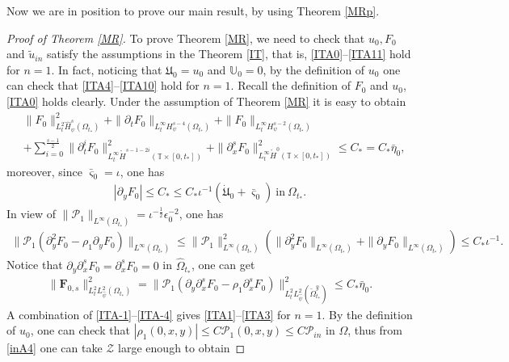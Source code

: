 \documentclass{amsart}
\numberwithin{equation}{section}
\begin{document}
Now we are in position to prove our main result, by using Theorem \ref{MRp}.
\begin{proof}[Proof of Theorem \ref{MR}]
To prove Theorem \ref{MR}, we need to check that $u_{0}, F_{0}$ and $\tilde{u}_{in}$ satisfy the assumptions in the Theorem \ref{IT}, that is, \eqref{ITA0}--\eqref{ITA11} hold for $n=1$.
In fact, noticing that $\mathfrak{U}_{0}=u_{0}$ and $\mathbb{U}_{0}=0$, by the definition of $u_{0}$ one can check that \eqref{ITA4}--\eqref{ITA10} hold for $n=1$.
Recall the definition of $F_{0}$ and $u_{0}$, \eqref{ITA0} holds clearly. Under the assumption of Theorem \ref{MR} it is easy to obtain
\begin{align}\label{ITA-1}
& \|F_{0}\|_{L_{t}^{2}\hat{H}_{\psi}^{s}(\Omega_{t_{*}})}^{2}
 +\|\partial_{t}F_{0}\|_{L_{t}^{\infty}H_{\psi}^{s-4}(\Omega_{t_{*}})}+\|F_{0}\|_{L_{t}^{\infty}H_{\psi}^{s-2}(\Omega_{t_{*}})}\\
&+\sum_{i=0}^{\frac{s-1}{2}}\|\partial_{t}^{i}F_{0}\|_{L_{t}^{\infty}\mathring{H}^{s-1-2i}(\mathbb{T}\times[0,t_{*}])}^{2}
 +\|\partial_{x}^{s}F_{0}\|_{L_{t}^{\infty}\mathring{H}^{0}(\mathbb{T}\times[0,t_{*}])}^{2}
\leq C_{*}=C_{*}\bar{\eta}_{0},\nonumber
\end{align}
moreover, since $\bar{\varsigma}_{0}=\iota$, one has
\begin{align}\label{ITA-2}
|\partial_{y}F_{0}|\leq C_{*}\leq C_{*}\iota^{-1}(\dot{\mathfrak{U}}_{0}+\bar{\varsigma}_{0})~\text{in}~\Omega_{t_{*}}.
\end{align}
In view of $\|\mathcal{P}_{1}\|_{L^{\infty}(\Omega_{t_{*}})}=\iota^{-\frac{1}{2}}\epsilon_{0}^{-2}$, one has
\begin{align}\label{ITA-3}
\|\mathcal{P}_{1}(\partial_{y}^{2}F_{0}-\rho_{1}\partial_{y}F_{0})\|_{L^{\infty}(\Omega_{t_{*}})}
\leq \|\mathcal{P}_{1}\|_{L^{\infty}(\Omega_{t_{*}})}^{2}
     \left(\|\partial_{y}^{2}F_{0}\|_{L^{\infty}(\Omega_{t_{*}})}+\|\partial_{y}F_{0}\|_{L^{\infty}(\Omega_{t_{*}})}\right)
\leq C_{*}\iota^{-1}.
\end{align}
Notice that $\partial_{y}\partial_{x}^{s}F_{0}=\partial_{x}^{s}F_{0}=0$ in $\hat{\Omega}_{t_{*}}$, one can get
\begin{align}\label{ITA-4}
\|\mathbf{F}_{0,s}\|_{L_{t}^{2}L_{\hat{\psi}}^{2}(\Omega_{t_{*}})}^{2}
=\|\mathcal{P}_{1}\left(\partial_{y}\partial_{x}^{s}F_{0}-\rho_{1}\partial_{x}^{s}F_{0}\right)\|_{L_{t}^{2}L_{\hat{\psi}}^{2}(\check{\Omega}_{t_{*}}^{\hat{y}})}^{2}
\leq C_{*}\bar{\eta}_{0}.
\end{align}
A combination of \eqref{ITA-1}--\eqref{ITA-4} gives \eqref{ITA1}--\eqref{ITA3} for $n=1$. By the definition of $u_{0}$, one can check that $|\rho_{1}(0,x,y)|\leq C\mathcal{P}_{1}(0,x,y)\leq C\mathcal{P}_{in}$ in $\Omega$, thus from \eqref{inA4} one can take $\mathcal{Z}$ large enough to obtain

\end{proof}
\end{document}
